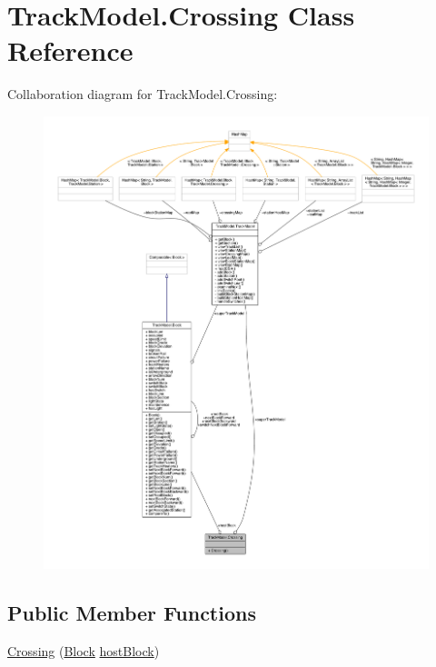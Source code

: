 \hypertarget{classTrackModel_1_1Crossing}{}\section{Track\+Model.\+Crossing Class Reference}
\label{classTrackModel_1_1Crossing}


Collaboration diagram for Track\+Model.\+Crossing\+:
\nopagebreak
\begin{figure}[H]
\begin{center}
\leavevmode
\includegraphics[width=350pt]{classTrackModel_1_1Crossing__coll__graph}
\end{center}
\end{figure}
\subsection*{Public Member Functions}
\begin{DoxyCompactItemize}
\item 
\hyperlink{classTrackModel_1_1Crossing_ab23fc0855d053936d68d367ce898d152}{Crossing} (\hyperlink{classTrackModel_1_1Block}{Block} \hyperlink{classTrackModel_1_1Crossing_a1e9bc8acd2681fa0c85cf43cfec99368}{host\+Block})
\end{DoxyCompactItemize}
